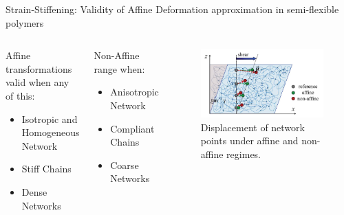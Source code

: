\documentclass[9pt]{beamer}
\begin{document}
\begin{frame}{Strain-Stiffening: Validity of Affine Deformation approximation in semi-flexible polymers}
  \begin{columns}[onlytextwidth]
    \begin{exampleblock}{Affine transformations valid when any of this: }
      \begin{itemize}
        \item Isotropic and Homogeneous Network
        \item Stiff Chains
        \item Dense Networks
      \end{itemize}
    \end{exampleblock}
    \begin{alertblock}{Non-Affine range when:}
      \begin{itemize}
        \item Anisotropic Network
        \item Compliant Chains
        \item Coarse Networks
      \end{itemize}
      \footnotesize{\citep{wilhelm_elasticity_2003}}
    \end{alertblock}
      \begin{figure}[htpb]
        \centering
        \includegraphics[width=0.99\textwidth]{./Figures/nonaffine.png}
        \caption*{Displacement of network points under affine and non-affine regimes. \footnotesize{\citep{basu_nonaffine_2011, wen_non-affine_2012}}}
      \end{figure}
  \end{columns}
\end{frame}
\end{document}
